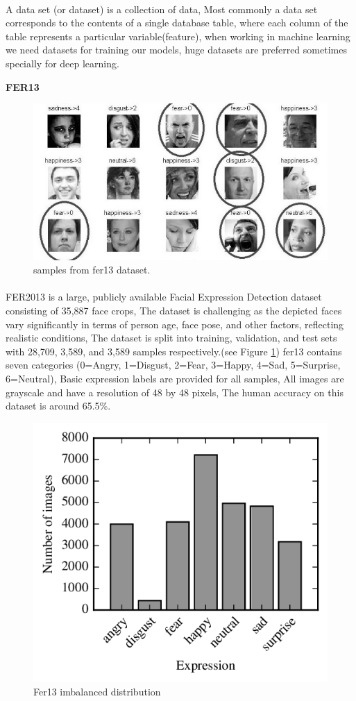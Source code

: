 \paragraph{}
A data set (or dataset) is a collection of data, Most commonly a data set corresponds to the contents of a single database table, where each column of the table represents a particular variable(feature), when working in machine learning we need datasets for training our models, huge datasets are preferred sometimes specially for deep learning.\newline

\textbf{FER13}
\begin{figure}
	\centering
	\includegraphics[width=.7\textwidth]{images/fer2013.jpg}
	\caption{samples from fer13 dataset.}
\end{figure} 
\paragraph{}
FER2013 is a large, publicly available Facial Expression Detection dataset consisting of 35,887 face crops, The dataset is challenging as the depicted faces vary significantly in terms of person age, face pose, and other factors, reflecting realistic conditions, 
The dataset is split into training, validation, and test sets with 28,709, 3,589, and 3,589 samples respectively.(see Figure \ref{fig:fer13})\newline
fer13 contains seven categories (0=Angry, 1=Disgust, 2=Fear, 3=Happy, 4=Sad, 5=Surprise, 6=Neutral), Basic expression labels are provided for all samples, All images are grayscale and have a resolution of 48 by 48 pixels, The human accuracy on this dataset is around 65.5\%. 
 
\begin{figure}
	\centering
	\includegraphics[width=.5\textwidth]{images/fer_dis.png}
	\caption{Fer13 imbalanced distribution}
	\label{fig:fer13}
\end{figure} 
